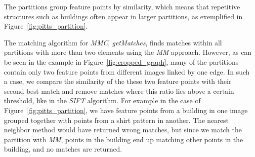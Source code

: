 \documentclass[conference]{IEEEtran}
\begin{document}
The partitions group feature points by similarity, which means that 
repetitive structures such as buildings often appear in larger 
partitions, as exemplified in Figure~\ref{fig:pitts_partition}.
%
%		
%

The matching algorithm for \emph{MMC}, \emph{getMatches}, finds matches 
within all partitions with more than two elements using the \emph{MM} 
approach.  However, as can be seen in the example in 
Figure~\ref{fig:cropped_graph}, many of the partitions contain only two 
feature points from different images linked by one edge. In such a case, 
we compare the similarity of the these two feature points with their 
second best match and remove matches where this ratio lies above a 
certain threshold, like in the \emph{SIFT} algorithm. For example in the 
case of Figure~\ref{fig:pitts_partition}, we have feature points from a 
building in one image grouped together with points from a shirt pattern 
in another.  The nearest neighbor method would have returned wrong 
matches, but since we match the partition with \emph{MM}, points in the 
building end up matching other points in the building, and no matches 
are returned.
\end{document}
